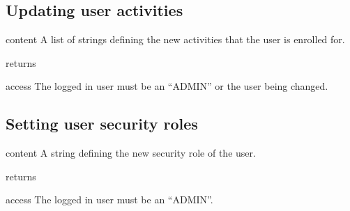 \subsection{Updating user activities}

\begin{apidata}{content}
  A list of strings defining the new activities that the user is enrolled for.
\end{apidata}
\begin{apidata}{returns}
  \begin{datalist}
  \end{datalist}
\end{apidata}
\begin{apidata}{access}
The logged in user must be an ``ADMIN'' or the user being changed.
\end{apidata}


\subsection{Setting user security roles}
\begin{apidata}{content}
  A string defining the new security role of the user. 
\end{apidata}
\begin{apidata}{returns}
  \begin{datalist}
  \end{datalist}
\end{apidata}
\begin{apidata}{access}
The logged in user must be an ``ADMIN''.
\end{apidata}

